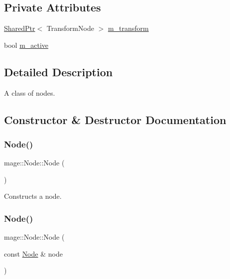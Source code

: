 \subsection*{Private Attributes}
\begin{DoxyCompactItemize}
\item 
\hyperlink{namespacemage_a1e01ae66713838a7a67d30e44c67703e}{Shared\+Ptr}$<$ Transform\+Node $>$ \hyperlink{classmage_1_1_node_a0b8161cc8480dcd9340309c3773c49f2}{m\+\_\+transform}
\item 
bool \hyperlink{classmage_1_1_node_ac4dd6c399de8b2a92df92365df7ecdac}{m\+\_\+active}
\end{DoxyCompactItemize}


\subsection{Detailed Description}
A class of nodes. 

\subsection{Constructor \& Destructor Documentation}
\hypertarget{classmage_1_1_node_a58b816eaa1dfd3c4b7f14896f190587f}{}\label{classmage_1_1_node_a58b816eaa1dfd3c4b7f14896f190587f} 
\subsubsection{\texorpdfstring{Node()}{Node()}\hspace{0.1cm}{\footnotesize\ttfamily [1/3]}}
{\footnotesize\ttfamily mage\+::\+Node\+::\+Node (\begin{DoxyParamCaption}{ }\end{DoxyParamCaption})}

Constructs a node. \hypertarget{classmage_1_1_node_af9da591163469f210895f3a5b389d7cc}{}\label{classmage_1_1_node_af9da591163469f210895f3a5b389d7cc} 
\subsubsection{\texorpdfstring{Node()}{Node()}\hspace{0.1cm}{\footnotesize\ttfamily [2/3]}}
{\footnotesize\ttfamily mage\+::\+Node\+::\+Node (\begin{DoxyParamCaption}\item[{const \hyperlink{classmage_1_1_node}{Node} \&}]{node }\end{DoxyParamCaption})}

